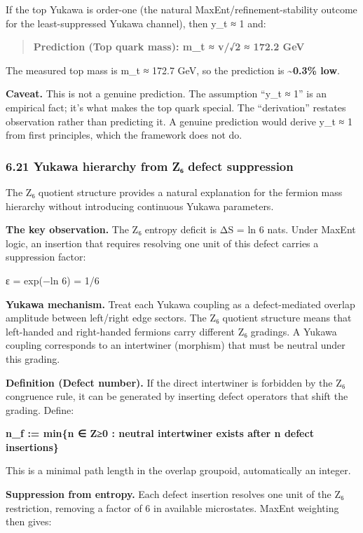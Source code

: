 \documentclass[11pt,a4paper]{article}
\theoremstyle{remark}
\begin{document}
If the top Yukawa is order-one (the natural MaxEnt/refinement-stability outcome for the least-suppressed Yukawa channel), then y\_t ≈ 1 and:

\begin{quote}
\textbf{Prediction (Top quark mass): m\_t ≈ v/√2 ≈ 172.2 GeV}
\end{quote}

The measured top mass is m\_t ≈ 172.7 GeV, so the prediction is \textbf{\textasciitilde0.3\% low}.

\textbf{Caveat.} This is not a genuine prediction. The assumption ``y\_t ≈ 1'' is an empirical fact; it's what makes the top quark special. The ``derivation'' restates observation rather than predicting it. A genuine prediction would derive y\_t ≈ 1 from first principles, which the framework does not do.

\subsubsection{6.21 Yukawa hierarchy from Z₆ defect suppression}\label{yukawa-hierarchy-from-zux2086-defect-suppression}

The Z₆ quotient structure provides a natural explanation for the fermion
mass hierarchy without introducing continuous Yukawa parameters.

\textbf{The key observation.} The Z₆ entropy deficit is ΔS = ln 6 nats. Under MaxEnt logic, an insertion that requires resolving one unit of this defect carries a suppression factor:

ε = exp(−ln 6) = 1/6

\textbf{Yukawa mechanism.} Treat each Yukawa coupling as a defect-mediated overlap amplitude between left/right edge sectors. The Z₆ quotient structure means that left-handed and right-handed fermions carry different Z₆ gradings. A Yukawa coupling corresponds to an intertwiner (morphism) that must be neutral under this grading.

\textbf{Definition (Defect number).} If the direct intertwiner is forbidden by the Z₆ congruence rule, it can be generated by inserting defect operators that shift the grading. Define:

\textbf{n\_f := min\{n ∈ Z≥0 : neutral intertwiner exists after n defect insertions\}}

This is a minimal path length in the overlap groupoid, automatically an integer.

\textbf{Suppression from entropy.} Each defect insertion resolves one unit of the Z₆ restriction, removing a factor of 6 in available microstates. MaxEnt weighting then gives:
\end{document}
